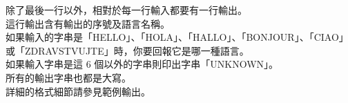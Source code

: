 除了最後一行以外，相對於每一行輸入都要有一行輸出。\\
這行輸出含有輸出的序號及語言名稱。\\
如果輸入的字串是「HELLO」、「HOLA」、「HALLO」、「BONJOUR」、「CIAO」或「ZDRAVSTVUJTE」時，你要回報它是哪一種語言。\\
如果輸入字串是這 6 個以外的字串則印出字串「UNKNOWN」。\\
所有的輸出字串也都是大寫。\\
詳細的格式細節請參見範例輸出。\\
